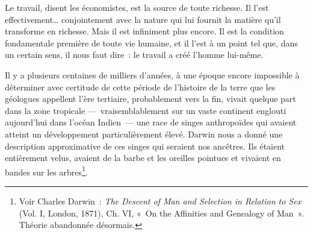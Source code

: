 \documentclass[french,twoside]{book} %
\begin{document}
\noindent Le travail, disent les économistes, est la source de toute richesse. Il l’est effectivement… conjointement avec la nature qui lui fournit la matière qu’il transforme en richesse. Mais il est infiniment plus encore. Il est la condition fondamentale première de toute vie humaine, et il l’est à un point tel que, dans un certain sens, il nous faut dire : le travail a créé l’homme lui-même.\par
Il y a plusieurs centaines de milliers d’années, à une époque encore impossible à déterminer avec certitude de cette période de l’histoire de la terre que les géologues appellent l’ère tertiaire, probablement vers la fin, vivait quelque part dans la zone tropicale — vraisemblablement sur un vaste continent englouti aujourd’hui dans l’océan Indien — une race de singes anthropoïdes qui avaient atteint un développement particulièrement élevé. Darwin nous a donné une description approximative de ces singes qui seraient nos ancêtres. Ils étaient entièrement velus, avaient de la barbe et les oreilles pointues et vivaient en bandes sur les arbres\footnote{Voir Charles Darwin : \emph{The Descent of Man and Selection in Relation to Sex} (Vol. I, London, 1871), Ch. VI, « On the Affinities and Genealogy of Man ». Théorie abandonnée désormais.}.\par
\end{document}
